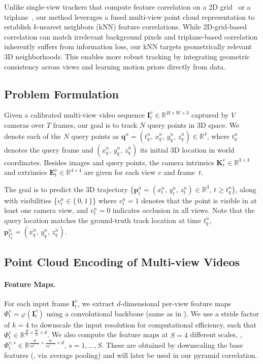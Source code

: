 \documentclass[10pt,twocolumn,letterpaper]{article}
\begin{document}
Unlike single-view trackers that compute feature correlation on a 2D grid~\cite{karaev2023cotracker,karaev24cotracker3,cho2024local,ngo2024delta,doersch2023tapir,doersch2023tapvid,harley2022particle} or a triplane~\cite{xiao2024spatialtracker}, our method leverages a fused multi-view point cloud representation to establish $k$-nearest neighbors (kNN) feature correlations. While 2D-grid-based correlation can match irrelevant background pixels and triplane-based correlation inherently suffers from information loss, our kNN targets geometrically relevant 3D neighborhoods. This enables more robust tracking by integrating geometric consistency across views and learning motion priors directly from data.

\subsection{Problem Formulation}
\label{sec:problem-formulation}
Given a calibrated multi-view video sequence $\mathbf{I}_t^v \in \mathbb{R}^{H \times W \times 3}$ captured by $V$ cameras over $T$ frames, our goal is to track $N$ query points in 3D space. We denote each of the $N$ query points as 
$\mathbf{q}^n = (t_q^n,\, x_q^n,\, y_q^n,\, z_q^n) \in \mathbb{R}^4$, 
where $t_q^n$ denotes the query frame and $(x_q^n,\, y_q^n,\, z_q^n)$ its initial 3D location in world coordinates. Besides images and query points, the camera intrinsics $\mathbf{K}_t^v \in \mathbb{R}^{3 \times 3}$ and extrinsics $\mathbf{E}_t^v \in \mathbb{R}^{4 \times 4}$ are given for each view $v$ and frame~$t$.

The goal is to predict the 3D trajectory 
\{$\mathbf{p}_t^n=(x_t^n,\, y_t^n,\, z_t^n) \in \mathbb{R}^3$, $t \ge t_q^n$\}, along with visibilities 
\{$v_t^n \in \{\,0,1\,\}$\}
where \(v_t^n = 1\) denotes that the point is visible in at least one camera view, and \(v_t^n = 0\) indicates occlusion in all views. Note that the query location matches the ground-truth track location at time $t_q^n$, \ie $\mathbf{p}_{t_q^n}^n = (x_q^n,\, y_q^n,\, z_q^n)$.

\subsection{Point Cloud Encoding of Multi-view Videos}
\label{sec:fused-point-cloud}
\paragraph{Feature Maps.}
For each input frame $\mathbf{I}_t^v$, we extract $d$-dimensional per-view feature maps
$\Phi_t^v = \mathcal{\varphi}(\mathbf{I}_t^v)$
using a convolutional backbone (same as in \cite{karaev24cotracker3,karaev2023cotracker,xiao2024spatialtracker}).
We use a stride factor of $k=4$ to downscale the input resolution for computational efficiency, such that
$\Phi_t^v \in \mathbb{R}^{\frac{H}{k} \times \frac{W}{k} \times d}$.
We also compute the feature maps at $S=4$ different scales, \ie, $\Phi_t^{v,s} \in \mathbb{R}^{\frac{H}{k2^{s-1}} \times \frac{W}{k2^{s-1}} \times d}$, $s = 1,\dots,S$. These are obtained by downscaling the base features (\eg, via average pooling) and will later be used in our pyramid correlation.
\end{document}
